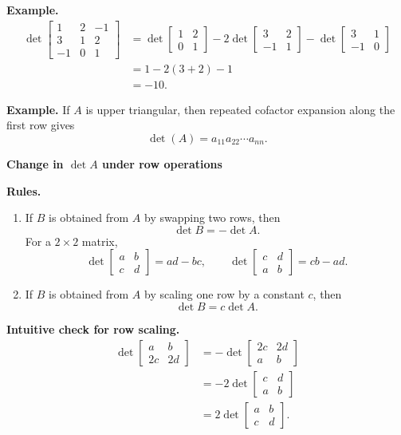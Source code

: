 \documentclass[letterpaper]{article}
\newcommand{\noteheader}[1]{\par\medskip\noindent\textbf{#1}\ }
\begin{document}
\noteheader{Example.}
\begin{align*}
\det\begin{bmatrix}1&2&-1\\3&1&2\\-1&0&1\end{bmatrix}
&=\det\begin{bmatrix}1&2\\0&1\end{bmatrix}
-2\det\begin{bmatrix}3&2\\-1&1\end{bmatrix}
-\det\begin{bmatrix}3&1\\-1&0\end{bmatrix}\\
&=1-2(3+2)-1\\
&=-10.
\end{align*}

\clearpage

\textbf{Example.} If $A$ is upper triangular, then repeated cofactor expansion along the first row gives
\[
\det(A)=a_{11}a_{22}\cdots a_{nn}.
\]

\bigskip

\noteheader{Change in $\det A$ under row operations}

\noteheader{Rules.}
\begin{enumerate}
\item If $B$ is obtained from $A$ by swapping two rows, then
\[
\det B=-\det A.
\]
For a $2\times2$ matrix,
\[
\det\begin{bmatrix}a&b\\c&d\end{bmatrix}=ad-bc,
\qquad
\det\begin{bmatrix}c&d\\a&b\end{bmatrix}=cb-ad.
\]

\item If $B$ is obtained from $A$ by scaling one row by a constant $c$, then
\[
\det B=c\det A.
\]
\end{enumerate}

\clearpage

\textbf{Intuitive check for row scaling.}
\begin{align*}
\det\begin{bmatrix}a&b\\2c&2d\end{bmatrix}
&=-\det\begin{bmatrix}2c&2d\\a&b\end{bmatrix}\\
&=-2\det\begin{bmatrix}c&d\\a&b\end{bmatrix}\\
&=2\det\begin{bmatrix}a&b\\c&d\end{bmatrix}.
\end{align*}
\end{document}
